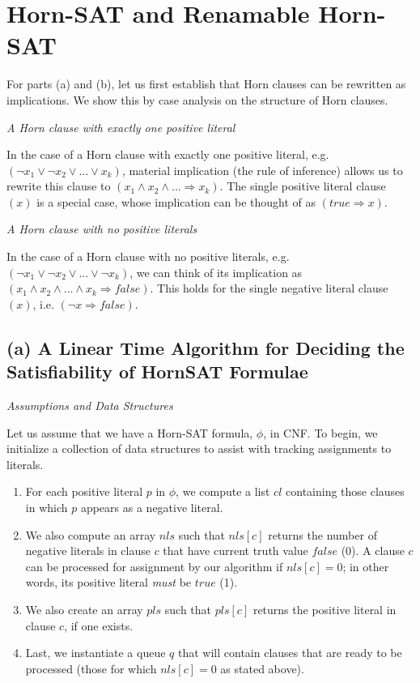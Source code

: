 \documentclass{article}
\begin{document}
\section{\textbf{Horn-SAT and Renamable Horn-SAT}}

\bigskip
\noindent For parts (a) and (b), let us first establish that Horn clauses can be rewritten as implications. We show this by case analysis on the structure of Horn clauses.

\bigskip
\noindent\emph{A Horn clause with exactly one positive literal}
\bigskip

\noindent In the case of a Horn clause with exactly one positive literal, e.g.  $(\lnot x_1 \lor \lnot x_2 \lor ... \lor x_k)$, material implication (the rule of inference) allows us to rewrite this clause to $(x_1 \land x_2 \land ... \Rightarrow x_k)$. The single positive literal clause $(x)$ is a special case, whose implication can be thought of as $(true \Rightarrow x)$.

\bigskip
\noindent \emph{A Horn clause with no positive literals}

\bigskip
\noindent In the case of a Horn clause with no positive literals, e.g. $(\lnot x_1 \lor \lnot x_2 \lor ... \lor \lnot x_k)$, we can think of its implication as $(x_1 \land x_2 \land ... \land x_k \Rightarrow false)$. This holds for the single negative literal clause $(x)$, i.e. $(\lnot x \Rightarrow false)$.

\bigskip
\subsection{\textbf{(a) A Linear Time Algorithm for Deciding the Satisfiability of HornSAT Formulae}}

\bigskip
\noindent \emph{Assumptions and Data Structures}

\medskip
\noindent Let us assume that we have a Horn-SAT formula, $\phi$, in CNF.  To begin, we initialize a collection of data structures to assist with tracking assignments to literals.
\begin{enumerate}
  \item For each positive literal $p$ in $\phi$, we compute a list $cl$ containing those clauses in which $p$ appears as a negative literal.
  \item We also compute an array $nls$ such that $nls[c]$ returns the number of negative literals in clause $c$ that have current truth value $false$ (0). A clause $c$ can be processed for assignment by our algorithm if $nls[c] = 0$; in other words, its positive literal \emph{must} be $true$ (1).
  \item We also create an array $pls$ such that $pls[c]$ returns the positive literal in clause $c$, if one exists.
  \item Last, we instantiate a queue $q$ that will contain clauses that are ready to be processed (those for which $nls[c] = 0$ as stated above).
\end{enumerate}
\end{document}
